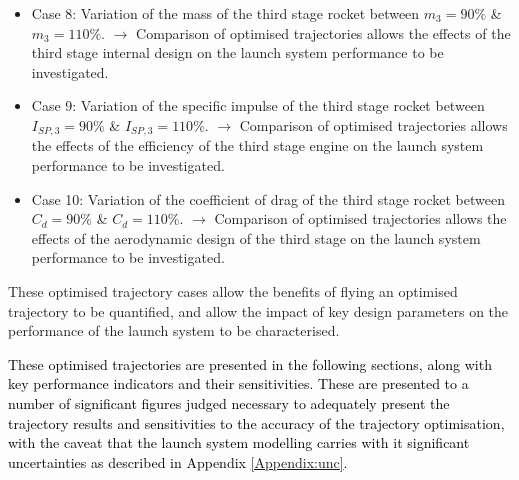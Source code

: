 \begin{itemize}
	\item Case 8: Variation of the mass of the third stage rocket between $m_3 = 90\%$ \& $m_3 = 110\%$. 
	\newline$\rightarrow$ Comparison of optimised trajectories allows the effects of the third stage internal design on the launch system performance to be investigated. 
	\item Case 9: Variation of the specific impulse of the third stage rocket between $I_{SP,3} = 90\%$ \& $I_{SP,3} = 110\%$. 
	\newline$\rightarrow$ Comparison of optimised trajectories allows the effects of the efficiency of the third stage engine on the launch system performance to be investigated. 
	\item Case 10: Variation of the coefficient of drag of the third stage rocket between $C_d = 90\%$ \& $C_d = 110\%$.
	\newline$\rightarrow$ Comparison of optimised trajectories allows the effects of the aerodynamic design of the third stage on the launch system performance to be investigated.
\end{itemize}
These optimised trajectory cases allow the benefits of flying an optimised trajectory to be quantified, and allow the impact of key design parameters on the performance of the launch system to be characterised. 

 \textcolor{black}{These optimised trajectories are presented in the following sections, along with key performance indicators and their sensitivities. These are presented to a number of significant figures judged necessary to adequately present the trajectory results and sensitivities to the accuracy of the trajectory optimisation, with the caveat that the launch system modelling carries with it significant uncertainties as described in Appendix \ref{Appendix:unc}.}
  

